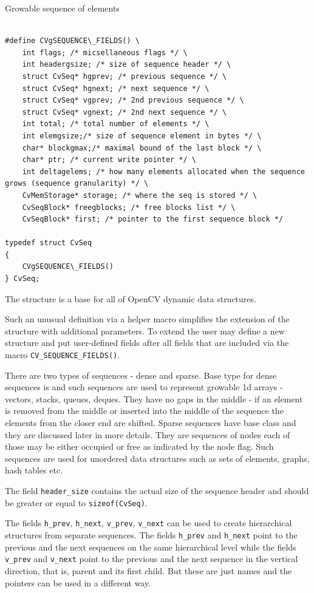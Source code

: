 Growable sequence of elements

\begin{lstlisting}

#define CVgSEQUENCE\_FIELDS() \
    int flags; /* micsellaneous flags */ \
    int headergsize; /* size of sequence header */ \
    struct CvSeq* hgprev; /* previous sequence */ \
    struct CvSeq* hgnext; /* next sequence */ \
    struct CvSeq* vgprev; /* 2nd previous sequence */ \
    struct CvSeq* vgnext; /* 2nd next sequence */ \
    int total; /* total number of elements */ \
    int elemgsize;/* size of sequence element in bytes */ \
    char* blockgmax;/* maximal bound of the last block */ \
    char* ptr; /* current write pointer */ \
    int deltagelems; /* how many elements allocated when the sequence grows (sequence granularity) */ \
    CvMemStorage* storage; /* where the seq is stored */ \
    CvSeqBlock* freegblocks; /* free blocks list */ \
    CvSeqBlock* first; /* pointer to the first sequence block */

typedef struct CvSeq
{
    CVgSEQUENCE\_FIELDS()
} CvSeq;

\end{lstlisting}

The structure  is a base for all of OpenCV dynamic data structures.

Such an unusual definition via a helper macro simplifies the extension
of the structure \cross{CvSeq} with additional parameters. To extend
\cross{CvSeq} the user may define a new structure and put user-defined
fields after all \cross{CvSeq} fields that are included via the macro
\texttt{CV\_SEQUENCE\_FIELDS()}.

There are two types of sequences - dense and sparse. Base type for dense
sequences is \cross{CvSeq} and such sequences are used to represent
growable 1d arrays - vectors, stacks, queues, deques. They have no gaps
in the middle - if an element is removed from the middle or inserted
into the middle of the sequence the elements from the closer end are
shifted. Sparse sequences have  base class and they are
discussed later in more details. They are sequences of nodes each of
those may be either occupied or free as indicated by the node flag. Such
sequences are used for unordered data structures such as sets of elements,
graphs, hash tables etc.

The field \texttt{header\_size} contains the actual size of the sequence
header and should be greater or equal to \texttt{sizeof(CvSeq)}.

The fields
\texttt{h\_prev}, \texttt{h\_next}, \texttt{v\_prev}, \texttt{v\_next}
can be used to create hierarchical structures from separate sequences. The
fields \texttt{h\_prev} and \texttt{h\_next} point to the previous and
the next sequences on the same hierarchical level while the fields
\texttt{v\_prev} and \texttt{v\_next} point to the previous and the
next sequence in the vertical direction, that is, parent and its first
child. But these are just names and the pointers can be used in a
different way.

